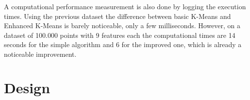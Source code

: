 \documentclass[12pt]{article}
\begin{document}
	A computational performance measurement is also done by logging the execution times. Using the previous dataset the difference between basic K-Means and Enhanced K-Means is barely noticeable, only a few milliseconds. However, on a dataset of 100.000 points with 9 features each the computational times are 14 seconds for the simple algorithm and 6 for the improved one, which is already a noticeable improvement.
	
	\section{Design}
	
	\newpage
	
	
\end{document}
